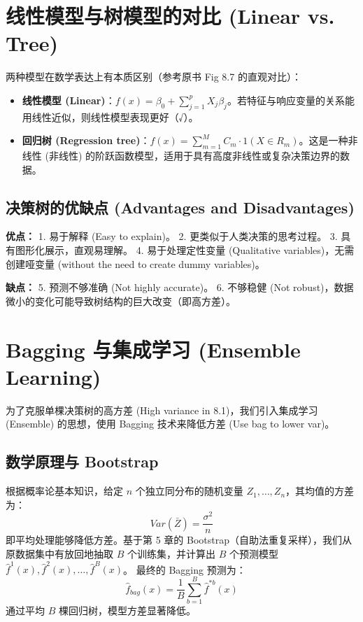 \documentclass[UTF8]{ctexart}
\numberwithin{equation}{section}
\begin{document}
\section{线性模型与树模型的对比 (Linear vs. Tree)}
两种模型在数学表达上有本质区别（参考原书 Fig 8.7 的直观对比）：
\begin{itemize}
    \item \textbf{线性模型 (Linear)}：$f(x) = \beta_0 + \sum_{j=1}^p X_j \beta_j$。若特征与响应变量的关系能用线性近似，则线性模型表现更好（√）。
    \item \textbf{回归树 (Regression tree)}：$f(x) = \sum_{m=1}^M C_m \cdot 1(X \in R_m)$。这是一种非线性 (非线性) 的阶跃函数模型，适用于具有高度非线性或复杂决策边界的数据。
\end{itemize}

\subsection{决策树的优缺点 (Advantages and Disadvantages)}
\textbf{优点：}
1. 易于解释 (Easy to explain)。
2. 更类似于人类决策的思考过程。
3. 具有图形化展示，直观易理解。
4. 易于处理定性变量 (Qualitative variables)，无需创建哑变量 (without the need to create dummy variables)。

\textbf{缺点：}
5. 预测不够准确 (Not highly accurate)。
6. 不够稳健 (Not robust)，数据微小的变化可能导致树结构的巨大改变（即高方差）。

\section{Bagging 与集成学习 (Ensemble Learning)}
为了克服单棵决策树的高方差 (High variance in 8.1)，我们引入集成学习 (Ensemble) 的思想，使用 Bagging 技术来降低方差 (Use bag to lower var)。

\subsection{数学原理与 Bootstrap}
根据概率论基本知识，给定 $n$ 个独立同分布的随机变量 $Z_1, \dots, Z_n$，其均值的方差为：
\begin{equation}
    Var(\bar{Z}) = \frac{\sigma^2}{n}
\end{equation}
即平均处理能够降低方差。基于第 5 章的 Bootstrap（自助法重复采样），我们从原数据集中有放回地抽取 $B$ 个训练集，并计算出 $B$ 个预测模型 $\hat{f}^1(x), \hat{f}^2(x), \dots, \hat{f}^B(x)$。
最终的 Bagging 预测为：
\begin{equation}
    \hat{f}_{bag}(x) = \frac{1}{B} \sum_{b=1}^B \hat{f}^{*b}(x)
\end{equation}
通过平均 $B$ 棵回归树，模型方差显著降低。
\end{document}
